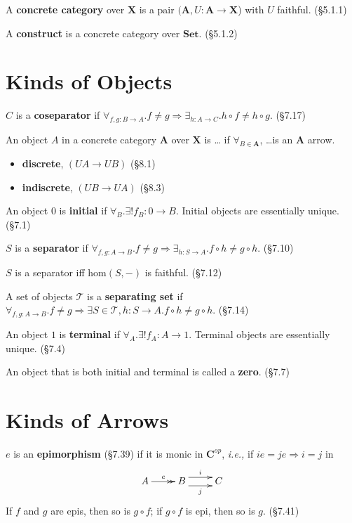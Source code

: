 \documentclass[10pt,twocolumn,letterpaper]{article}
\newcommand{\defn}[1]{{\bf #1}}
\begin{document}
  A \defn{concrete category} over $\mathbf{X}$ is a pair $(\mathbf{A},U :
  \mathbf{A} \to \mathbf{X}$) with $U$ faithful. (\S5.1.1)

  A \defn{construct} is a concrete category over $\mathbf{Set}$. (\S5.1.2)

\section{Kinds of Objects}

  $C$ is a \defn{coseparator} if $\forall_{f,g : B \to A} . f \ne g
  \Rightarrow \exists_{h : A \to C} . h \circ f \ne h \circ g$. (\S7.17)

  An object $A$ in a concrete category $\mathbf{A}$ over $\mathbf{X}$ is
  \dots\! if $\forall_{B \in \mathbf{A}}$, \dots is an $\mathbf{A}$ arrow.
  \begin{itemize}
    \item \defn{discrete}, $(UA \to UB)$ (\S8.1)
    \item \defn{indiscrete}, $(UB \to UA)$ (\S8.3)
  \end{itemize}

  An object $0$ is \defn{initial} if $\forall_B . \exists! f_B : 0 \to B$.
  Initial objects are essentially unique. (\S7.1)

  $S$ is a \defn{separator} if $\forall_{f,g : A \to B} . f \ne g
  \Rightarrow \exists_{h : S \to A} . f \circ h \ne g \circ h$. (\S7.10)

  $S$ is a separator iff $\mbox{hom}(S,-)$ is faithful. (\S7.12)

  A set of objects $\mathcal{T}$ is a \defn{separating set} if
  $\forall_{f,g : A \to B} . f \ne g \Rightarrow \exists{S \in \mathcal{T},
  h : S \to A} . f \circ h \ne g \circ h$. (\S7.14)

  An object $1$ is \defn{terminal} if $\forall_A . \exists! f_A : A \to 1$.
  Terminal objects are essentially unique. (\S7.4)

  An object that is both initial and terminal is called a \defn{zero}.
  (\S7.7)

\section{Kinds of Arrows}

  $e$ is an \defn{epimorphism} (\S7.39) if it is monic in $\mathbf{C}^{op}$,
          {\it i.e.,} if $ie = je \Rightarrow i = j$ in
    \[\xymatrix{A \ar@{->>}[r]^e & B \ar@<1ex>[r]^{i} \ar@<-1ex>[r]_j & C} \]
  If $f$ and $g$ are epis, then so is $g \circ f$; if $g \circ f$ is epi,
  then so is $g$. (\S7.41)
\end{document}
